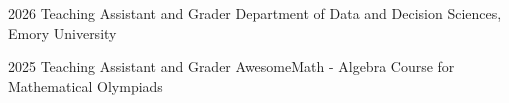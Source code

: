 
\begin{cvskills}

  \cvskill
    {2026} %
    {Teaching Assistant and Grader} %
    {Department of Data and Decision Sciences, Emory University} %

  \cvskill
    {2025} %
    {Teaching Assistant and Grader} %
    {AwesomeMath - Algebra Course for Mathematical Olympiads} %
\end{cvskills}
